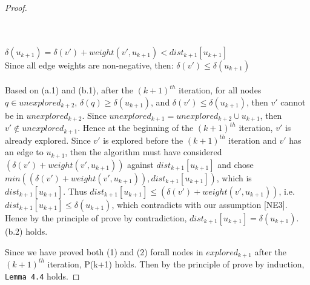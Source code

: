 \begin{proof}
\begin{itemize}
  \\\\
  \ftab $\delta(u_{k+1}) = \delta(v') + weight(v', u_{k+1}) < dist_{k+1}[u_{k+1}]$ \\
  \tab\tab\tab Since all edge weights are non-negative, then: $\delta(v') \leq \delta(u_{k+1})$
  \\\\
  Based on (a.1) and (b.1), after the $(k+1)^{th}$ iteration, for all nodes $q \in unexplored_{k+2}$, $\delta(q) \geq \delta(u_{k+1})$, and $\delta(v') \leq \delta(u_{k+1})$, then $v'$ cannot be in $unexplored_{k+2}$. Since $unexplored_{k+1} = unexplored_{k+2} \cup u_{k+1}$, then $v' \notin unexplored_{k+1}$. Hence at the beginning of the $(k+1)^{th}$ iteration, $v'$ is already explored. Since $v'$ is explored before the $(k+1)^{th}$ iteration and $v'$ has an edge to $u_{k+1}$, then the algorithm must have considered $(\delta(v') + weight(v', u_{k+1}))$ against $dist_{k+1}[u_{k+1}]$ and chose $min((\delta(v') + weight(v', u_{k+1})), dist_{k+1}[u_{k+1}])$, which is $dist_{k+1}[u_{k+1}]$. Thus $dist_{k+1}[u_{k+1}] \leq (\delta(v') + weight(v', u_{k+1}))$, i.e. $dist_{k+1}[u_{k+1}] \leq \delta(u_{k+1})$, which contradicts with our assumption [NE3]. Hence by the principle of prove by contradiction, $dist_{k+1}[u_{k+1}] = \delta(u_{k+1})$. (b.2) holds. 
\end{itemize}
Since we have proved both (1) and (2) forall nodes in $explored_{k+1}$ after the $(k+1)^{th}$ iteration, P(k+1) holds. Then by the principle of prove by induction, \texttt{Lemma 4.4} holds. 
\end{proof}